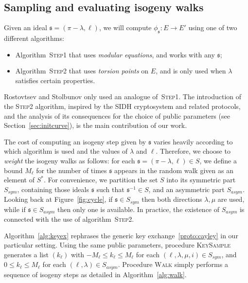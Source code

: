 \documentclass{article}
\newcommand{\algstyle}[1]{\textsc{#1}}
\renewcommand{\frak}{\mathfrak}
\theoremstyle{definition}
\begin{document}
\subsection{Sampling and evaluating isogeny walks}

Given an ideal $\frak s = (\pi-\lambda, \ell)$, we will compute $\phi_{\frak s}:E\to E'$
using one of two different algorithms:
\begin{itemize}
\item Algorithm~\algstyle{Step1} that uses
	\emph{modular equations}, and works with any $\frak s$;
\item Algorithm~\algstyle{Step2} that
	uses \emph{torsion points} on $E$, and is only used when
	$\lambda$ satisfies certain properties.
\end{itemize}

Rostovtsev and Stolbunov only used an analogue of~\algstyle{Step1}. 
The introduction of the \algstyle{Step2} algorithm, 
inspired by the SIDH cryptosystem and related protocols, 
and the analysis of its consequences for the choice of public
parameters (see Section~\ref{sec:initcurve}),
is the main contribution of our work.

The cost of computing an isogeny step given by $\frak s$
varies heavily according to which algorithm is used and the values of $\lambda$
and $\ell$. Therefore, we choose to \emph{weight} the isogeny walks as
follows: for each $\frak s = (\pi-\lambda,\ell)\in S$,
we define a bound $M_\ell$ for the number of times $\frak s$
appears in the random walk given as an element of $S^*$.
For convenience, we partition the set $S$
into its symmetric part $S_{sym}$, containing those ideals $\frak s$ such that
$\frak s^{-1}\in S$, and an asymmetric part $S_{asym}$. Looking back at
Figure~\ref{fig:cycle}, if $\frak s\in S_{sym}$ then both directions
$\lambda,\mu$ are used, while if $\frak s\in S_{asym}$ then only one is
available. In practice, the existence of $S_{asym}$ is connected with the use of
algorithm~\algstyle{Step2}.

Algorithm~\ref{alg:keyex} rephrases the generic key exchange~\ref{proto:cayley}
in our particular setting. Using the same public parameters, procedure
\algstyle{KeySample} generates a list $(k_\ell)$ with $-M_\ell\leq k_\ell\leq M_\ell$
for each $(\ell, \lambda, \mu, i)\in S_{sym}$, and $0\leq k_\ell\leq M_\ell$ for
each $(\ell, \lambda)\in S_{asym}$. Procedure \algstyle{Walk} simply performs
a sequence of isogeny steps as detailed in Algorithm~\ref{alg:walk}.
\end{document}
